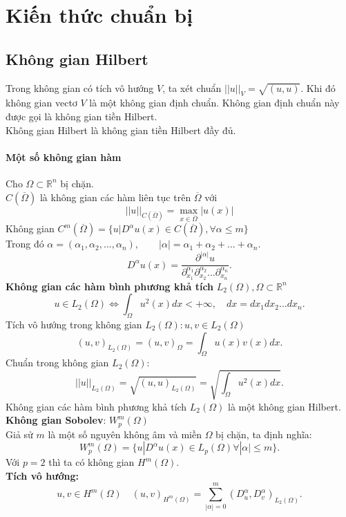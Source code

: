 \documentclass[
12pt, %
oneside, %
english, %
onehalfspacing, %
nolistspacing, %
headsepline, %
addchap,
]{MastersDoctoralThesis} %
\begin{document}
\chapter{Kiến thức chuẩn bị}\label{Chapter0}
\section{Không gian Hilbert}

\begin{defi}
Trong không gian có tích vô hướng $V$, ta xét chuẩn $||u||_V = \sqrt{(u,u)}$. Khi đó không gian vectơ $V$ là một không gian định chuẩn. Không gian định chuẩn này được gọi là không gian tiền Hilbert.\\
Không gian Hilbert là không gian tiền Hilbert đầy đủ.
\end{defi}
\subsubsection*{Một số không gian hàm}
Cho $\Omega \subset\mathbb{R}^n$ bị chặn.\\
$C(\overline{\Omega})$ là không gian các hàm liên tục trên $\overline{\Omega}$ với
$$||u||_{C(\overline{\Omega})}=\max_{x\in \overline{\Omega}}|u(x)|$$
Không gian $C^m(\overline{\Omega}) = \{u|D^\alpha u(x)\in C(\overline{\Omega}), \forall \alpha \leq m\}$\\
Trong đó $\alpha =(\alpha_1,\alpha_2,...,\alpha_n), \qquad |\alpha| = \alpha_1 + \alpha_2 + ... + \alpha_n.$
$$D^\alpha u(x)=\frac{\partial^{|\alpha|}u}{\partial^{\alpha_1}_{x_1}\partial^{\alpha_2}_{x_2}...\partial^{\alpha_n}_{x_n}}.$$
\textbf{Không gian các hàm bình phương khả tích} $L_2(\Omega),\Omega \subset \mathbb{R}^n$
$$u \in L_2(\Omega)\Leftrightarrow\int_\Omega u^2(x)dx< +\infty ,\quad dx = dx_1dx_2...dx_n.$$
Tích vô hướng trong không gian $L_2(\Omega): u,v \in L_2(\Omega)$
$$(u,v)_{L_2(\Omega)}=(u,v)_\Omega=\int_\Omega u(x)v(x)dx.$$
Chuẩn trong không gian $L_2(\Omega)$:
$$||u||_{L_2(\Omega)}=\sqrt{(u,u)_{L_2(\Omega)}}=\sqrt{\int_\Omega u^2(x)dx}.$$
Không gian các hàm bình phương khả tích $L_2(\Omega)$ là một không gian Hilbert.\\
\textbf{Không gian Sobolev}: $W^m_p(\Omega)$\\
Giả sử $m$ là một số nguyên không âm và miền $\Omega$ bị chặn, ta định nghĩa:
$$W^m_p(\Omega)=\{u|D^\alpha u(x)\in L_p(\Omega)\forall |\alpha|\leq m\}.$$
Với $p=2$ thì ta có không gian $H^m(\Omega)$.\\
\textbf{Tích vô hướng:}
$$u,v\in H^m(\Omega)\quad (u,v)_{H^m(\Omega)}=\sum_{|\alpha|=0}^m(D^\alpha_u,D^\alpha_v)_{L_2(\Omega)}.$$
\end{document}
